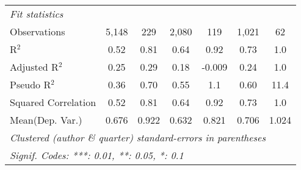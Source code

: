 \begin{tabular}{lcccccc}
   \midrule
   \emph{Fit statistics}\\
   Observations                                               & 5,148         & 229            & 2,080         & 119         & 1,021   & 62\\  
   R$^2$                                                      & 0.52          & 0.81           & 0.64          & 0.92        & 0.73    & 1.0\\  
   Adjusted R$^2$                                             & 0.25          & 0.29           & 0.18          & -0.009      & 0.24    & 1.0\\  
   Pseudo R$^2$                                               & 0.36          & 0.70           & 0.55          & 1.1         & 0.60    & 11.4\\  
   Squared Correlation                                        & 0.52          & 0.81           & 0.64          & 0.92        & 0.73    & 1.0\\  
Mean(Dep. Var.) & 0.676 & 0.922 & 0.632 & 0.821 & 0.706 & 1.024 \\
   \midrule \midrule
   \multicolumn{7}{l}{\emph{Clustered (author \& quarter) standard-errors in parentheses}}\\
   \multicolumn{7}{l}{\emph{Signif. Codes: ***: 0.01, **: 0.05, *: 0.1}}\\
\end{tabular}
\par\endgroup
